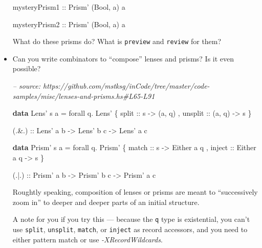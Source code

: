 \documentclass[]{article}
\newenvironment{Shaded}{}{}
\newcommand{\CommentTok}[1]{\textcolor[rgb]{0.38,0.63,0.69}{\textit{#1}}}
\newcommand{\DataTypeTok}[1]{\textcolor[rgb]{0.56,0.13,0.00}{#1}}
\newcommand{\FunctionTok}[1]{\textcolor[rgb]{0.02,0.16,0.49}{#1}}
\newcommand{\KeywordTok}[1]{\textcolor[rgb]{0.00,0.44,0.13}{\textbf{#1}}}
\newcommand{\NormalTok}[1]{#1}
\newcommand{\OtherTok}[1]{\textcolor[rgb]{0.00,0.44,0.13}{#1}}
\begin{document}
\begin{itemize}
\begin{Shaded}
\begin{Highlighting}[]
\OtherTok{mysteryPrism1 ::} \DataTypeTok{Prism'}\NormalTok{ (}\DataTypeTok{Bool}\NormalTok{, a) a}

\OtherTok{mysteryPrism2 ::} \DataTypeTok{Prism'}\NormalTok{ (}\DataTypeTok{Bool}\NormalTok{, a) a}
\end{Highlighting}
\end{Shaded}

  What do these prisms do? What is \texttt{preview} and \texttt{review} for
  them?
\item
  Can you write combinators to ``compose'' lenses and prisms? Is it even
  possible?

\begin{Shaded}
\begin{Highlighting}[]
\CommentTok{-- source: https://github.com/mstksg/inCode/tree/master/code-samples/misc/lenses-and-prisms.hs#L65-L91}

\KeywordTok{data} \DataTypeTok{Lens'}\NormalTok{ s a }\FunctionTok{=}\NormalTok{ forall q}\FunctionTok{.} \DataTypeTok{Lens'}
\NormalTok{    \{}\OtherTok{ split   ::}\NormalTok{ s }\OtherTok{->}\NormalTok{ (a, q)}
\NormalTok{    ,}\OtherTok{ unsplit ::}\NormalTok{ (a, q) }\OtherTok{->}\NormalTok{ s}
\NormalTok{    \}}

\OtherTok{(.&.) ::} \DataTypeTok{Lens'}\NormalTok{ a b}
      \OtherTok{->} \DataTypeTok{Lens'}\NormalTok{ b c}
      \OtherTok{->} \DataTypeTok{Lens'}\NormalTok{ a c}

\KeywordTok{data} \DataTypeTok{Prism'}\NormalTok{ s a }\FunctionTok{=}\NormalTok{ forall q}\FunctionTok{.} \DataTypeTok{Prism'}
\NormalTok{    \{}\OtherTok{ match  ::}\NormalTok{ s }\OtherTok{->} \DataTypeTok{Either}\NormalTok{ a q}
\NormalTok{    ,}\OtherTok{ inject ::} \DataTypeTok{Either}\NormalTok{ a q }\OtherTok{->}\NormalTok{ s}
\NormalTok{    \}}

\OtherTok{(.|.) ::} \DataTypeTok{Prism'}\NormalTok{ a b}
      \OtherTok{->} \DataTypeTok{Prism'}\NormalTok{ b c}
      \OtherTok{->} \DataTypeTok{Prism'}\NormalTok{ a c}
\end{Highlighting}
\end{Shaded}

  Roughtly speaking, composition of lenses or prisms are meant to ``successively
  zoom in'' to deeper and deeper parts of an initial structure.

  A note for you if you try this --- because the \texttt{q} type is existential,
  you can't use \texttt{split}, \texttt{unsplit}, \texttt{match}, or
  \texttt{inject} as record accessors, and you need to either pattern match or
  use \emph{-XRecordWildcards}.


\end{itemize}
\end{document}
